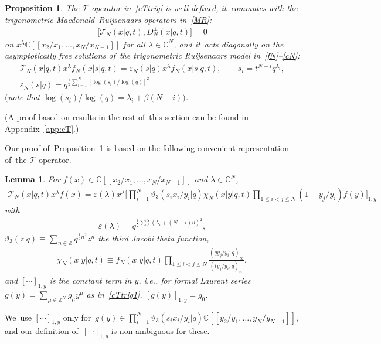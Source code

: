 \documentclass[pdftex]{sigma}%
\numberwithin{equation}{section}
\newtheorem{Lemma}[Theorem]{Lemma}
\newtheorem{Proposition}[Theorem]{Proposition}
\newcommand{\C}{{\mathbb C}}
\newcommand{\Z}{{\mathbb Z}}
\newcommand{\cT}{{\mathcal T}}
\begin{document}
\begin{Proposition}\label{prop:cT}
The $\cT$-operator in~\eqref{cTtrig} is well-defined, it~commutes with the trigonometric Macdonald--Ruijsenaars operators in~\eqref{MR}:
\begin{gather}\label{commutativity}
\big[\cT_N(x|q,t),D_N^\pm(x|q,t)\big] =0
\end{gather}
on $x^\lambda \C[[x_2/x_1,\dots,x_N/x_{N-1}]]$ for all $\lambda\in\C^N$, and it~acts diagonally on the asymptotically free solutions of~the trigonometric Ruijsenaars model in~\eqref{fN}--\eqref{cN}:
\begin{gather}
\cT_N(x|q,t) x^\lambda f_N(x|s|q,t)=\varepsilon_N(s|q) x^\lambda f_N(x|s|q,t),\qquad s_i=t^{N-i}q^{\lambda_i},
\\
\label{vepsN11}
\varepsilon_N(s|q) = q^{\frac12\sum_{i=1}^N[\log(s_i)/\log(q)]^2}
\end{gather}
$($note that $\log(s_i)/\log(q)=\lambda_i+\beta(N-i))$.
\end{Proposition}
(A proof based on results in the rest of~this section can be found in Appendix~\ref{app:cT}.)

Our proof of~Proposition~\ref{prop:cT} is based on the following convenient representation of~the \mbox{$\cT$-operator}.
\begin{Lemma}
\label{lem:cTtrig}
For $f(x)\in \C[[x_2/x_1,\dots,x_N/x_{N-1}]]$ and $\lambda\in\C^N$,
\begin{gather}
\label{cTtrig1}
\cT_N(x|q,t) x^\lambda f(x) = \varepsilon(\lambda)x^\lambda\Bigg[\prod_{i=1}^N\vartheta_3(s_ix_i/y_i|q) \chi_N(x|y|q,t)\!\!\prod_{1\leq i<j\leq N}\!\!(1-y_j/y_i)f(y)\Bigg]_{1,y}
\end{gather}
with
\begin{gather*}
\varepsilon(\lambda)= q^{\frac12\sum_{i^1}^N(\lambda_i+(N-i)\beta)^2},
\end{gather*}
$\vartheta_3(z|q)\equiv \sum_{n\in\Z}q^{\frac12 n^2}z^n$ the third Jacobi theta function,
\begin{gather}
\label{psiN}
\chi_N(x|y|q,t)\equiv f_N(x|y|q,t)\prod_{1\leq i<j\leq N}\frac{(qy_j/y_i;q)_\infty}{(ty_j/y_i;q)_\infty} ,
\end{gather}
and $[\cdots]_{1,y}$ is the constant term in $y$, i.e., for formal Laurent series $g(y)=\sum_{\mu\in\Z^N}g_\mu y^\mu$ as in~\eqref{cTtrig1}, $[g(y)]_{1,y}=g_0$.
\end{Lemma}

\begin{Remark}
We~use $[\cdots]_{1,y}$ only for~$g(y)\in \prod_{i=1}^N\vartheta_3(s_ix_i/y_i|q) \C[[y_2/y_1,\dots,y_N/y_{N-1}]]$,
and our definition of~$[\cdots]_{1,y}$ is non-ambiguous for these.
\end{Remark}
\end{document}
